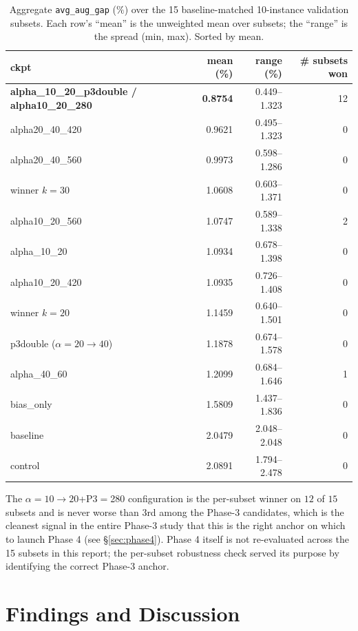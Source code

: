 \documentclass[11pt,a4paper]{article}
\begin{document}
\begin{table}[t]
\centering
\caption{Aggregate \texttt{avg\_aug\_gap} ($\%$) over the 15
baseline-matched 10-instance validation subsets. Each row's ``mean'' is
the unweighted mean over subsets; the ``range'' is the spread (min, max).
Sorted by mean.}
\label{tab:robust}
\small
\begin{tabular}{l r r r}
\toprule
ckpt                      & mean (\%) & range (\%) & \# subsets won \\
\midrule
\rowcolor{sdmblue!10}
\textbf{alpha\_10\_20\_p3double / alpha10\_20\_280} & \textbf{0.8754} & 0.449--1.323 & 12 \\
alpha20\_40\_420          & 0.9621 & 0.495--1.323 & 0 \\
alpha20\_40\_560          & 0.9973 & 0.598--1.286 & 0 \\
winner $k\!=\!30$         & 1.0608 & 0.603--1.371 & 0 \\
alpha10\_20\_560          & 1.0747 & 0.589--1.338 & 2 \\
alpha\_10\_20             & 1.0934 & 0.678--1.398 & 0 \\
alpha10\_20\_420          & 1.0935 & 0.726--1.408 & 0 \\
winner $k\!=\!20$         & 1.1459 & 0.640--1.501 & 0 \\
p3double ($\alpha\!=\!20\!\to\!40$) & 1.1878 & 0.674--1.578 & 0 \\
alpha\_40\_60             & 1.2099 & 0.684--1.646 & 1 \\
bias\_only                & 1.5809 & 1.437--1.836 & 0 \\
\midrule
baseline                  & 2.0479 & 2.048--2.048 & 0 \\
control                   & 2.0891 & 1.794--2.478 & 0 \\
\bottomrule
\end{tabular}
\end{table}

The $\alpha\!=\!10\!\to\!20$+P3$=$280 configuration is the per-subset
winner on $12$ of $15$ subsets and is never worse than 3rd among the
Phase-3 candidates, which is the cleanest signal in the entire Phase-3
study that this is the right anchor on which to launch Phase 4 (see
\S\ref{sec:phase4}). Phase 4 itself is not re-evaluated across the 15
subsets in this report; the per-subset robustness check served its
purpose by identifying the correct Phase-3 anchor.

\section{Findings and Discussion}
\label{sec:findings}
\end{document}
